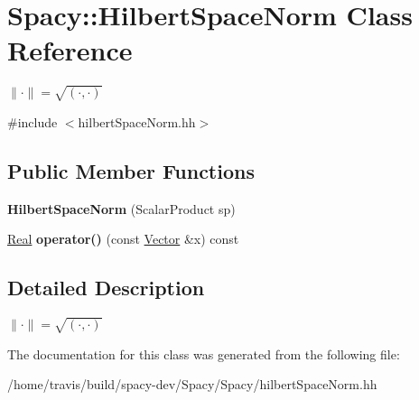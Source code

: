 \hypertarget{classSpacy_1_1HilbertSpaceNorm}{\section{\-Spacy\-:\-:\-Hilbert\-Space\-Norm \-Class \-Reference}
\label{classSpacy_1_1HilbertSpaceNorm}
}


$ \|\cdot\|=\sqrt{(\cdot,\cdot)} $  




{\ttfamily \#include $<$hilbert\-Space\-Norm.\-hh$>$}

\subsection*{\-Public \-Member \-Functions}
\begin{DoxyCompactItemize}
\item 
\hypertarget{classSpacy_1_1HilbertSpaceNorm_aba5acc55249256d58fbba34911446ca2}{{\bfseries \-Hilbert\-Space\-Norm} (\-Scalar\-Product sp)}\label{classSpacy_1_1HilbertSpaceNorm_aba5acc55249256d58fbba34911446ca2}

\item 
\hypertarget{classSpacy_1_1HilbertSpaceNorm_a042d8b6148297e16c0244e50799967c5}{\hyperlink{classSpacy_1_1Real}{\-Real} {\bfseries operator()} (const \hyperlink{classSpacy_1_1Vector}{\-Vector} \&x) const }\label{classSpacy_1_1HilbertSpaceNorm_a042d8b6148297e16c0244e50799967c5}

\end{DoxyCompactItemize}


\subsection{\-Detailed \-Description}
$ \|\cdot\|=\sqrt{(\cdot,\cdot)} $ 

\-The documentation for this class was generated from the following file\-:\begin{DoxyCompactItemize}
\item 
/home/travis/build/spacy-\/dev/\-Spacy/\-Spacy/hilbert\-Space\-Norm.\-hh\end{DoxyCompactItemize}
